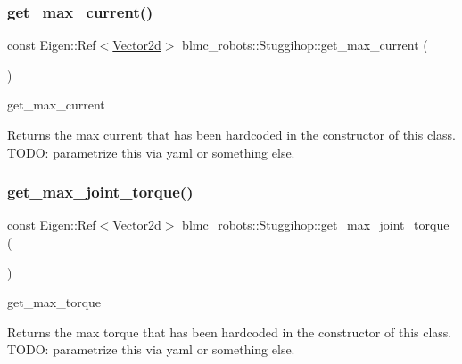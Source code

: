 \subsubsection{\texorpdfstring{get\+\_\+max\+\_\+current()}{get\_max\_current()}}
{\footnotesize\ttfamily const Eigen\+::\+Ref$<$\hyperlink{common__header_8hpp_acb6916bc8c9fe9d98c484fd4cc201447}{Vector2d}$>$ blmc\+\_\+robots\+::\+Stuggihop\+::get\+\_\+max\+\_\+current (\begin{DoxyParamCaption}{ }\end{DoxyParamCaption})\hspace{0.3cm}{\ttfamily [inline]}}



get\+\_\+max\+\_\+current 

\begin{DoxyReturn}{Returns}
the max current that has been hardcoded in the constructor of this class. T\+O\+DO\+: parametrize this via yaml or something else. 
\end{DoxyReturn}
\mbox{\label{classblmc__robots_1_1Stuggihop_a4d0344d8fa31e2e959dfcb3c3f5538e9}} 
\subsubsection{\texorpdfstring{get\+\_\+max\+\_\+joint\+\_\+torque()}{get\_max\_joint\_torque()}}
{\footnotesize\ttfamily const Eigen\+::\+Ref$<$\hyperlink{common__header_8hpp_acb6916bc8c9fe9d98c484fd4cc201447}{Vector2d}$>$ blmc\+\_\+robots\+::\+Stuggihop\+::get\+\_\+max\+\_\+joint\+\_\+torque (\begin{DoxyParamCaption}{ }\end{DoxyParamCaption})\hspace{0.3cm}{\ttfamily [inline]}}



get\+\_\+max\+\_\+torque 

\begin{DoxyReturn}{Returns}
the max torque that has been hardcoded in the constructor of this class. T\+O\+DO\+: parametrize this via yaml or something else. 
\end{DoxyReturn}
\mbox{\label{classblmc__robots_1_1Stuggihop_a6da6fdecb11573e52a0c059d84e7f4c5}} 
